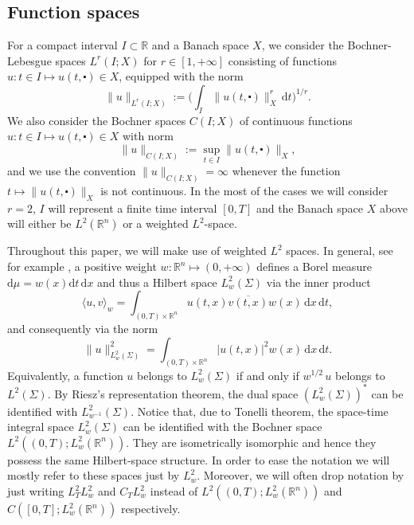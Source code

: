 \documentclass[10pt,a4paper]{amsart}
\theoremstyle{remark}
\theoremstyle{definition}
\newcommand{\R}{\mathbb{R}}
\newcommand{\dd}{\mathrm{d}}
\def\cd{\centerdot}
\begin{document}





\subsection{Function spaces}\label{subsec: spaces} For a compact interval $I\subset \R$ and a Banach space $X$, we consider the Bochner-Lebesgue spaces $L^r(I; X)$ for $r\in[1,+\infty]$ consisting of functions $u: t\in I \mapsto u(t, \cd) \in X $, equipped with the norm 
%
\begin{equation}\label{eq: mixed_norms}
\|u\|_{L^r(I; X)}:= \Big( \int_I \|u(t, \cd)\|_X^r\, \dd t \Big)^{1/r}.
\end{equation}
%
We also consider the Bochner spaces $C(I; X)$ of continuous functions $u: t\in I \mapsto u(t, \cd) \in X $ with norm
\[
\|u\|_{C(I; X)}:= \sup_{t\in I}\|u(t, \cd)\|_{X},
\]
and we use the convention $\|u\|_{C(I; X)}=\infty$ whenever the function $t\mapsto \|u(t, \cd)\|_X$ is not continuous.
In the most of the cases we will consider $r=2$, $I$ will represent a finite time interval $[0, T]$ and the Banach space $X$ above will either be $L^2(\R^n)$ or a weighted $L^2$-space.
%
 


Throughout this paper, we will make use of weighted $L^2$ spaces. In general, see for example \cite{Rudin}, a positive weight $w:\R^n \mapsto(0,+\infty)$ defines a Borel measure $\dd \mu = w(x)\dd t \, \dd x$ and thus a Hilbert space $L^2_w(\Sigma)$ via the inner product 
%
\begin{equation}\label{eq: inner_product_weighted}
\langle u, v\rangle_w = \int_{(0,T)\times \R^n}u(t,x)\overline{v(t,x)}w(x)\,\dd x \, \dd t,
\end{equation}
%
and consequently via the norm
%
\[
\|u\|^2_{L^2_w(\Sigma)}=  \int_{(0, T)\times \R^n}|u(t,x)|^2 w(x)\,\dd x \, \dd t.
\]
%
Equivalently, a function $u$ belongs to $L^2_w(\Sigma)$ if and only if $w^{1/2}\, u$ belongs to $L^2(\Sigma)$.
By Riesz's representation theorem, the dual space $(L^2_w(\Sigma))^*$ can be identified with $L^2_{w^{-1}}(\Sigma)$. Notice that, due to Tonelli theorem, the space-time integral space $L^2_w(\Sigma)$ can be identified with the Bochner space $ L^2((0, T); L^2_w(\R^n))$. They are isometrically isomorphic and hence they possess the same Hilbert-space structure. In order to ease the notation we will mostly refer to these spaces just by $L^2_w$. Moreover, we will often drop notation by just writing $L^2_TL^2_w$ and $C_TL^2_w$ instead of $L^2((0, T); L^2_w(\R^n))$ and $C([0, T]; L^2_w(\R^n))$ respectively.
\end{document}
